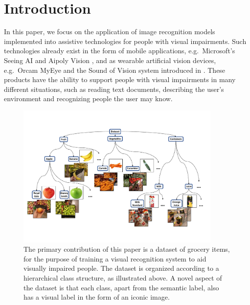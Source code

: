 \section{Introduction}\label{paperA:sec:introduction}

In this paper, we focus on the application of image recognition models implemented into assistive technologies for people with visual impairments. Such technologies already exist in the form of mobile applications, e.g.~Microsoft's Seeing AI  and Aipoly Vision , and as wearable artificial vision devices, e.g.~Orcam MyEye  and the Sound of Vision system introduced in . These products have the ability to support people with visual impairments in many different situations, such as reading text documents, describing the user's environment and recognizing people the user may know. 

\begin{figure}[t]
	\centering
    \includegraphics[width=0.9\textwidth]{PaperA/figures/intro.pdf}
    \vspace{-2mm}
    \caption{The primary contribution of this paper is a dataset of grocery items, for the purpose of training a visual recognition system to aid visually impaired people. The dataset is organized according to a hierarchical class structure, as illustrated above. A novel aspect of the dataset is that each class, apart from the semantic label, also has a visual label in the form of an iconic image.}
    \label{fig:examples} 
    \vspace{-3mm}
\end{figure}

